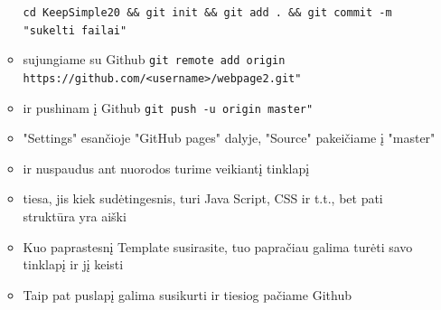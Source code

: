 \documentclass[12pt,a4paper]{article}
\begin{document}
\begin{enumerate}
\begin{itemize}
\colorbox{listinggray}{\lstinline|cd KeepSimple20 && git init && git add . && git commit -m "sukelti failai"|}
\item sujungiame su Github
\colorbox{listinggray}{\lstinline|git remote add origin https://github.com/<username>/webpage2.git"|}
\item ir pushinam į Github \colorbox{listinggray}{\lstinline|git push -u origin master"|}
\item "Settings" esančioje "GitHub pages" dalyje, "Source" pakeičiame į "master"
\item ir nuspaudus ant nuorodos turime veikiantį tinklapį

\begin{figure}[H]
\center
{}
\end{figure}

\item tiesa, jis kiek sudėtingesnis, turi Java Script, CSS ir t.t., bet pati struktūra yra aiški
\item Kuo paprastesnį Template susirasite, tuo papračiau galima turėti savo tinklapį ir jį keisti
\item Taip pat puslapį galima susikurti ir tiesiog pačiame Github

\end{itemize}













\end{enumerate}
\end{document}
